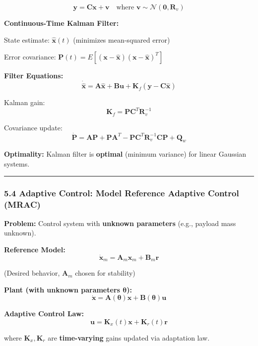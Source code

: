 \documentclass[
]{article}
\begin{document}
\[
\mathbf{y} = \mathbf{C} \mathbf{x} + \mathbf{v} \quad \text{where } \mathbf{v} \sim \mathcal{N}(\mathbf{0}, \mathbf{R}_v)
\]

\textbf{Continuous-Time Kalman Filter:}

State estimate: \(\hat{\mathbf{x}}(t)\) (minimizes mean-squared error)

Error covariance:
\(\mathbf{P}(t) = E[(\mathbf{x} - \hat{\mathbf{x}})(\mathbf{x} - \hat{\mathbf{x}})^T]\)

\textbf{Filter Equations:} \[
\dot{\hat{\mathbf{x}}} = \mathbf{A} \hat{\mathbf{x}} + \mathbf{B} \mathbf{u} + \mathbf{K}_f (\mathbf{y} - \mathbf{C} \hat{\mathbf{x}})
\]

Kalman gain: \[
\mathbf{K}_f = \mathbf{P} \mathbf{C}^T \mathbf{R}_v^{-1}
\]

Covariance update: \[
\dot{\mathbf{P}} = \mathbf{A} \mathbf{P} + \mathbf{P} \mathbf{A}^T - \mathbf{P} \mathbf{C}^T \mathbf{R}_v^{-1} \mathbf{C} \mathbf{P} + \mathbf{Q}_w
\]

\textbf{Optimality:} Kalman filter is \textbf{optimal} (minimum
variance) for linear Gaussian systems.

\begin{center}\rule{0.5\linewidth}{0.5pt}\end{center}

\hypertarget{adaptive-control-model-reference-adaptive-control-mrac}{%
\subsubsection{5.4 Adaptive Control: Model Reference Adaptive Control
(MRAC)}\label{adaptive-control-model-reference-adaptive-control-mrac}}

\textbf{Problem:} Control system with \textbf{unknown parameters} (e.g.,
payload mass unknown).

\textbf{Reference Model:} \[
\dot{\mathbf{x}}_m = \mathbf{A}_m \mathbf{x}_m + \mathbf{B}_m \mathbf{r}
\]

(Desired behavior, \(\mathbf{A}_m\) chosen for stability)

\textbf{Plant (with unknown parameters \(\boldsymbol{\theta}\)):} \[
\dot{\mathbf{x}} = \mathbf{A}(\boldsymbol{\theta}) \mathbf{x} + \mathbf{B}(\boldsymbol{\theta}) \mathbf{u}
\]

\textbf{Adaptive Control Law:} \[
\mathbf{u} = \mathbf{K}_x(t) \mathbf{x} + \mathbf{K}_r(t) \mathbf{r}
\]

where \(\mathbf{K}_x, \mathbf{K}_r\) are \textbf{time-varying} gains
updated via adaptation law.
\end{document}
